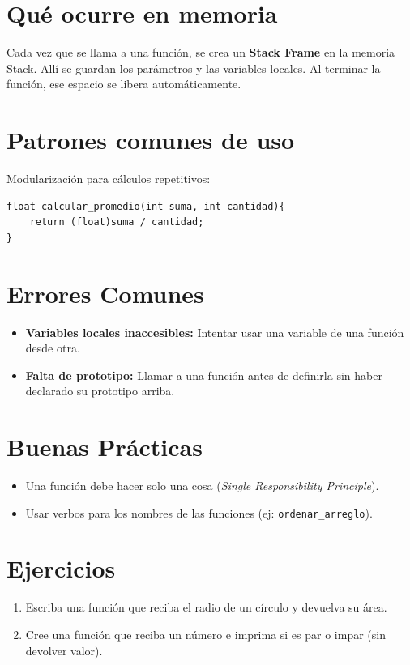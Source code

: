 \documentclass[12pt,a4paper]{article}
\begin{document}
\section{Qué ocurre en memoria}
Cada vez que se llama a una función, se crea un \textbf{Stack Frame} en la memoria Stack. Allí se guardan los parámetros y las variables locales. Al terminar la función, ese espacio se libera automáticamente.

\section{Patrones comunes de uso}
Modularización para cálculos repetitivos:
\begin{lstlisting}
float calcular_promedio(int suma, int cantidad){
    return (float)suma / cantidad;
}
\end{lstlisting}

\section{Errores Comunes}
\begin{itemize}
    \item \textbf{Variables locales inaccesibles:} Intentar usar una variable de una función desde otra.
    \item \textbf{Falta de prototipo:} Llamar a una función antes de definirla sin haber declarado su prototipo arriba.
\end{itemize}

\section{Buenas Prácticas}
\begin{itemize}
    \item Una función debe hacer solo una cosa (\textit{Single Responsibility Principle}).
    \item Usar verbos para los nombres de las funciones (ej: \texttt{ordenar\_arreglo}).
\end{itemize}

\section{Ejercicios}
\begin{enumerate}
    \item Escriba una función que reciba el radio de un círculo y devuelva su área.
    \item Cree una función que reciba un número e imprima si es par o impar (sin devolver valor).
\end{enumerate}
\end{document}
